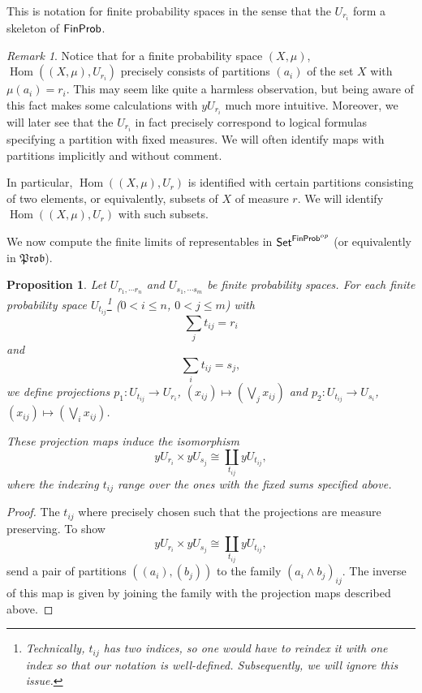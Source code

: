 \documentclass[a4paper]{amsproc}
\theoremstyle{plain}
\newtheorem{proposition}[theorem]{Proposition}
\theoremstyle{definition}
\theoremstyle{remark}
\newtheorem{remark}[theorem]{Remark}
\numberwithin{equation}{section}
\DeclareMathOperator{\Hom}{Hom}
\newcommand{\y}{\textit{y}}
\newcommand{\Set}{\textup{\textsf{Set}}}
\newcommand{\FinProb}{\textup{\textsf{FinProb}}}
\newcommand{\Prob}{\mathfrak{Prob}}
\begin{document}
This is notation for finite probability spaces in the sense that the $U_{r_i}$ form a skeleton of $\FinProb$.

\begin{remark}\label{classifying_partitions}
    Notice that for a finite probability space $(X,\mu)$, $\Hom((X,\mu), U_{r_i})$ precisely consists of partitions $(a_i)$ of the set $X$ with $\mu(a_i) = r_i$. This may seem like quite a harmless observation, but being aware of this fact makes some calculations with $\y U_{r_i}$ much more intuitive. Moreover, we will later see that the $U_{r_i}$ in fact precisely correspond to logical formulas specifying a partition with fixed measures. We will often identify maps with partitions implicitly and without comment.

    In particular, $\Hom((X,\mu), U_r)$ is identified with certain partitions consisting of two elements, or equivalently, subsets of $X$ of measure $r$. We will identify $\Hom((X,\mu), U_r)$ with such subsets.

\end{remark}

We now compute the finite limits of representables in $\Set^{\FinProb^{op}}$ (or equivalently in $\Prob$).

\begin{proposition} \label{multi-product}
    Let $U_{r_1, \cdots r_n}$ and $U_{s_1, \cdots s_m}$ be finite probability spaces. For each finite probability space $U_{t_{ij}}$\footnote{Technically, $t_{ij}$ has two indices, so one would have to reindex it with one index so that our notation is well-defined. Subsequently, we will ignore this issue.} ($0 < i \leq n$, $0 < j \leq m$) with
    \[
        \sum_j t_{ij} = r_i
    \]
    and
    \[
        \sum_i t_{ij} = s_j ,
    \]
    we define projections $p_1: U_{t_{ij}} \to U_{r_i}$, $(x_{ij}) \mapsto (\bigvee_j x_{ij})$ and $p_2: U_{t_{ij}} \to U_{s_i}$, $(x_{ij}) \mapsto (\bigvee_i x_{ij})$.

    These projection maps induce the isomorphism
    \[
    \y U_{r_i} \times \y U_{s_j} \cong \coprod_{t_{ij}} \y U_{t_{ij}} ,
    \]
    where the indexing $t_{ij}$ range over the ones with the fixed sums specified above.
\end{proposition}
\begin{proof}
    The $t_{ij}$ where precisely chosen such that the projections are measure preserving. To show
    \[
    \y U_{r_i} \times \y U_{s_j} \cong \coprod_{t_{ij}} \y U_{t_{ij}} ,
    \]
    send a pair of partitions $((a_i),(b_j))$ to the family $(a_i \wedge b_j)_{ij}$. The inverse of this map is given by joining the family with the projection maps described above.
\end{proof}
\end{document}
